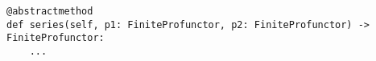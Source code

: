 \begin{verbatim}
@abstractmethod
def series(self, p1: FiniteProfunctor, p2: FiniteProfunctor) -> FiniteProfunctor:
    ...
\end{verbatim}